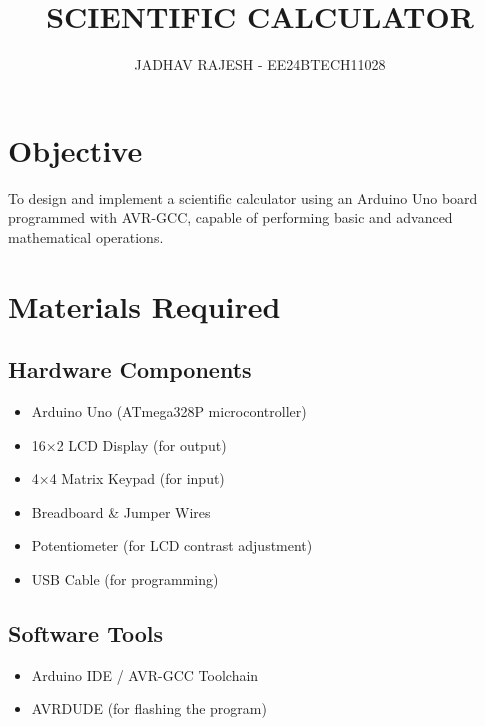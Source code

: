 \documentclass[12pt,a4paper]{article}
\title{SCIENTIFIC CALCULATOR}
\author{JADHAV RAJESH - EE24BTECH11028}
\begin{document}
\maketitle

\section*{Objective}
To design and implement a scientific calculator using an Arduino Uno board programmed with AVR-GCC, capable of performing basic and advanced mathematical operations.

\section*{Materials Required}
\subsection{Hardware Components}
\begin{itemize}
    \item Arduino Uno (ATmega328P microcontroller)
    \item 16×2 LCD Display (for output)
    \item 4×4 Matrix Keypad (for input)
    \item Breadboard \& Jumper Wires
    \item Potentiometer (for LCD contrast adjustment)
    \item USB Cable (for programming)
\end{itemize}

\subsection{Software Tools}
\begin{itemize}
    \item Arduino IDE / AVR-GCC Toolchain
    \item AVRDUDE (for flashing the program)
\end{itemize}
\end{document}
